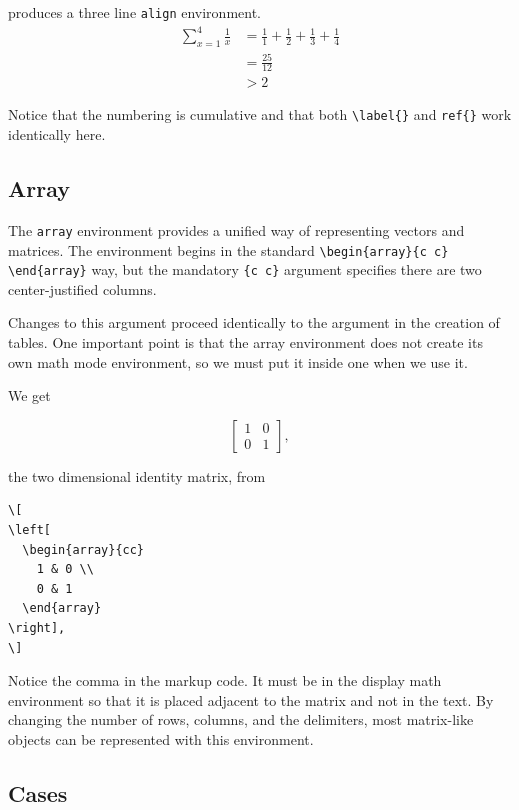 produces a three line \texttt{align} environment.
\begin{align}
   \sum_{x=1}^{4} \frac{1}{x}
   &= \frac{1}{1} + \frac{1}{2}  + \frac{1}{3} + \frac{1}{4} \\
   &= \frac{25}{12} \\
   &>2
\end{align}

Notice that the numbering is cumulative and that both \verb!\label{}!  and
\verb!ref{}! work identically here.


\subsection*{Array}

The \texttt{array} environment provides a unified way of representing vectors
and matrices. The environment begins in the standard
\verb!\begin{array}{c c} \end{array}! way, but the mandatory \verb!{c c}! argument
specifies there are two center-justified columns.

Changes to this argument proceed identically to the argument in the creation of
tables. One important point is that the array environment does not create its
own math mode environment, so we must put it inside one when we use it.

We get

\[
\left[
  \begin{array}{cc}
    1 & 0 \\
    0 & 1
  \end{array}
\right],
\]

the two dimensional identity matrix, from

\begin{lstlisting}
\[
\left[
  \begin{array}{cc}
    1 & 0 \\
    0 & 1
  \end{array}
\right],
\]
\end{lstlisting}

Notice the comma in the markup code. It must be in the display math environment
so that it is placed adjacent to the matrix and not in the text. By changing the
number of rows, columns, and the delimiters, most matrix-like objects can be
represented with this environment.

\subsection*{Cases}

